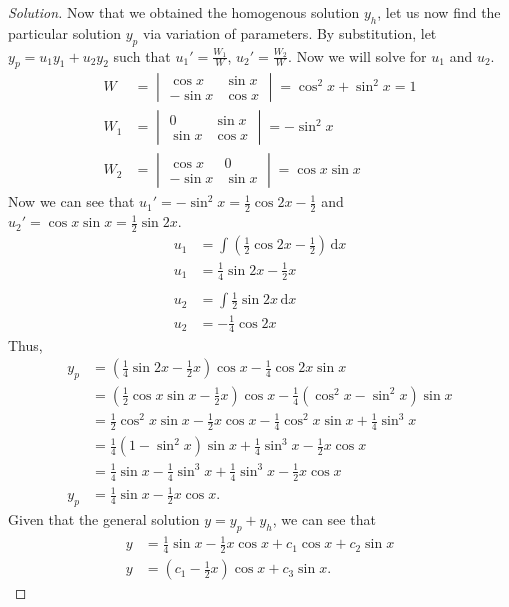 \documentclass[ 12pt ]{article}
\begin{document}
\begin{enumerate}
\begin{proof}[Solution]
			Now that we obtained the homogenous solution $y_h$, let us now find the particular solution $y_p$ via variation of parameters. By substitution, let
			$y_p = u_1y_1 + u_2y_2$ such that $u_1' = \frac{W_1}{W}$, $u_2' = \frac{W_2}{W}$. Now we will solve for $u_1$ and $u_2$.
			\begin{align*}
				W &= \begin{vmatrix} \cos x & \sin x \\ -\sin x & \cos x \end{vmatrix} = \cos^2 x + \sin^2 x = 1 \\
				W_1 &= \begin{vmatrix} 0 & \sin x \\ \sin x & \cos x \end{vmatrix} = -\sin^2 x \\
				W_2 &= \begin{vmatrix} \cos x & 0 \\ -\sin x & \sin x \end{vmatrix} = \cos x \sin x
			\end{align*}
			Now we can see that $u_1' = -\sin^2 x = \frac{1}{2}\cos 2x - \frac{1}{2}$ and $u_2' = \cos x \sin x = \frac{1}{2}\sin 2x$.
			\begin{align*}
				u_1 &= \int \left ( \frac{1}{2}\cos 2x - \frac{1}{2} \right )\, \mathrm{d}x \\
				u_1 &= \frac{1}{4}\sin 2x - \frac{1}{2}x \\ \\
				u_2 &= \int \frac{1}{2}\sin 2x\, \mathrm{d}x \\
				u_2 &= -\frac{1}{4}\cos 2x
			\end{align*}
			Thus,
			\begin{align*}
				y_p &= \left ( \frac{1}{4}\sin 2x - \frac{1}{2}x \right ) \cos x - \frac{1}{4}\cos 2x \sin x \\
				&= \left ( \frac{1}{2}\cos x\sin x - \frac{1}{2}x \right ) \cos x - \frac{1}{4}( \cos^2 x - \sin^2 x )\sin x \\
				&= \frac{1}{2} \cos^2 x \sin x - \frac{1}{2}x \cos x - \frac{1}{4} \cos^2 x \sin x + \frac{1}{4} \sin^3 x \\
				&= \frac{1}{4} (1 - \sin^2 x) \sin x + \frac{1}{4} \sin^3 x - \frac{1}{2}x \cos x \\
				&= \frac{1}{4} \sin x - \frac{1}{4} \sin^3 x + \frac{1}{4} \sin^3 x - \frac{1}{2}x \cos x \\
				y_p &= \frac{1}{4} \sin x - \frac{1}{2}x \cos x.
			\end{align*}
			Given that the general solution $y = y_p + y_h$, we can see that
			\begin{align*}
				y &= \frac{1}{4} \sin x - \frac{1}{2}x \cos x + c_1 \cos x + c_2 \sin x \\
				y &= \left ( c_1 - \frac{1}{2}x \right ) \cos x + c_3 \sin x.
			\end{align*}
		\end{proof}



\end{enumerate}
\end{document}
